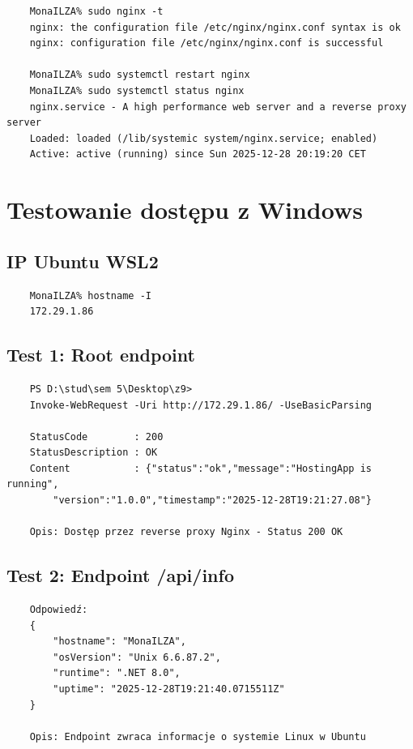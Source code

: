 \documentclass[twoside]{article}
\begin{document}
\begin{verbatim}
	MonaILZA% sudo nginx -t
	nginx: the configuration file /etc/nginx/nginx.conf syntax is ok
	nginx: configuration file /etc/nginx/nginx.conf is successful
	
	MonaILZA% sudo systemctl restart nginx
	MonaILZA% sudo systemctl status nginx
	nginx.service - A high performance web server and a reverse proxy server
	Loaded: loaded (/lib/systemic system/nginx.service; enabled)
	Active: active (running) since Sun 2025-12-28 20:19:20 CET
\end{verbatim}

\section{Testowanie dostępu z Windows}

\subsection{IP Ubuntu WSL2}

\begin{verbatim}
	MonaILZA% hostname -I
	172.29.1.86
\end{verbatim}

\subsection{Test 1: Root endpoint}

\begin{verbatim}
	PS D:\stud\sem 5\Desktop\z9> 
	Invoke-WebRequest -Uri http://172.29.1.86/ -UseBasicParsing
	
	StatusCode        : 200
	StatusDescription : OK
	Content           : {"status":"ok","message":"HostingApp is running",
		"version":"1.0.0","timestamp":"2025-12-28T19:21:27.08"}
	
	Opis: Dostęp przez reverse proxy Nginx - Status 200 OK
\end{verbatim}

\subsection{Test 2: Endpoint /api/info}

\begin{verbatim}
	Odpowiedź:
	{
		"hostname": "MonaILZA",
		"osVersion": "Unix 6.6.87.2",
		"runtime": ".NET 8.0",
		"uptime": "2025-12-28T19:21:40.0715511Z"
	}
	
	Opis: Endpoint zwraca informacje o systemie Linux w Ubuntu
\end{verbatim}
\end{document}
